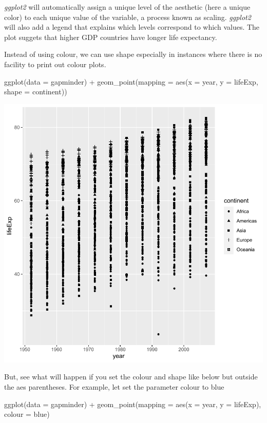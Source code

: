 \documentclass[
]{book}
\makeatletter
\newenvironment{Shaded}{\begin{snugshade}}{\end{snugshade}}
\newcommand{\AttributeTok}[1]{\textcolor[rgb]{0.61,0.61,0.61}{#1}}
\newcommand{\FunctionTok}[1]{\textcolor[rgb]{0,0,0}{#1}}
\newcommand{\NormalTok}[1]{#1}
\newcommand{\SpecialCharTok}[1]{\textcolor[rgb]{0,0,0}{#1}}
\newcommand{\StringTok}[1]{\textcolor[rgb]{0.5,0.5,0.5}{#1}}
\newenvironment{kframe}{%
\medskip{}
\setlength{\fboxsep}{.8em}
 \def\at@end@of@kframe{}%
 \ifinner\ifhmode%
  \def\at@end@of@kframe{\end{minipage}}%
  \begin{minipage}{\columnwidth}%
 \fi\fi%
 \def\FrameCommand##1{\hskip\@totalleftmargin \hskip-\fboxsep
 \colorbox{shadecolor}{##1}\hskip-\fboxsep
     \hskip-\linewidth \hskip-\@totalleftmargin \hskip\columnwidth}%
 \MakeFramed {\advance\hsize-\width
   \@totalleftmargin\z@ \linewidth\hsize
   \@setminipage}}%
 {\par\unskip\endMakeFramed%
 \at@end@of@kframe}
\renewenvironment{Shaded}{\begin{kframe}}{\end{kframe}}
\makeatother
\begin{document}
\emph{ggplot2} will automatically assign a unique level of the aesthetic (here a unique color) to each unique value of the variable, a process known as scaling. \emph{ggplot2} will also add a legend that explains which levels correspond to which values. The plot suggets that higher GDP countries have longer life expectancy.

Instead of using colour, we can use shape especially in instances where there is no facility to print out colour plots.

\begin{Shaded}
\begin{Highlighting}[]
\FunctionTok{ggplot}\NormalTok{(}\AttributeTok{data =}\NormalTok{ gapminder) }\SpecialCharTok{+}
  \FunctionTok{geom\_point}\NormalTok{(}\AttributeTok{mapping =} \FunctionTok{aes}\NormalTok{(}\AttributeTok{x =}\NormalTok{ year, }\AttributeTok{y =}\NormalTok{ lifeExp, }\AttributeTok{shape =}\NormalTok{ continent))}
\end{Highlighting}
\end{Shaded}

\begin{center}\includegraphics[width=0.7\linewidth,keepaspectratio]{Multivariable_Data_Analysis_files/figure-latex/unnamed-chunk-20-1} \end{center}

But, see what will happen if you set the colour and shape like below but outside the aes parentheses. For example, let set the parameter colour to blue

\begin{Shaded}
\begin{Highlighting}[]
\FunctionTok{ggplot}\NormalTok{(}\AttributeTok{data =}\NormalTok{ gapminder) }\SpecialCharTok{+}
  \FunctionTok{geom\_point}\NormalTok{(}\AttributeTok{mapping =} \FunctionTok{aes}\NormalTok{(}\AttributeTok{x =}\NormalTok{ year, }\AttributeTok{y =}\NormalTok{ lifeExp), }\AttributeTok{colour =} \StringTok{\textquotesingle{}blue\textquotesingle{}}\NormalTok{)}
\end{Highlighting}
\end{Shaded}
\end{document}
